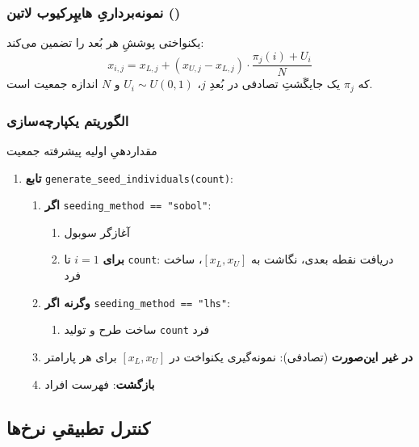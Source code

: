 \subsubsection{نمونه‌برداریِ هایپِرکیوب لاتین ()}

 یکنواختی پوششِ هر بُعد را تضمین می‌کند:
\begin{equation}\label{Eq.lhs_sampling}
x_{i,j} = x_{L,j} + (x_{U,j} - x_{L,j}) \cdot \frac{\pi_j(i) + U_i}{N}
\end{equation}
که \(\pi_j\) یک جایگَشتِ تصادفی در بُعدِ \(j\)، \(U_i \sim U(0,1)\) و \(N\) اندازه جمعیت است.

\subsubsection{الگوریتم یکپارچه‌سازی}

\begin{algorithm}
\caption{مقداردهیِ اولیه پیشرفته جمعیت}
\begin{enumerate}
\item \textbf{تابع} \texttt{generate\_seed\_individuals(count)}:
  \begin{enumerate}
  \item \textbf{اگر} \texttt{seeding\_method == "sobol"}:
    \begin{enumerate}
    \item آغازگر سوبول
    \item \textbf{برای} \(i=1\) تا \texttt{count}: دریافت نقطه بعدی، نگاشت به \([x_L,x_U]\)، ساخت فرد
    \end{enumerate}
  \item \textbf{وگرنه اگر} \texttt{seeding\_method == "lhs"}:
    \begin{enumerate}
    \item ساخت طرح  و تولید \texttt{count} فرد
    \end{enumerate}
  \item \textbf{در غیر این‌صورت} (تصادفی): نمونه‌گیری یکنواخت در \([x_L,x_U]\) برای هر پارامتر
  \item \textbf{بازگشت}: فهرست افراد
  \end{enumerate}
\end{enumerate}
\end{algorithm}

\subsection{کنترل تطبیقیِ نرخ‌ها}

